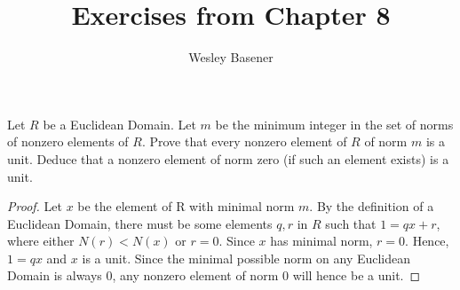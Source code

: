 \documentclass[10pt]{article}
\newenvironment{problem}[2][Problem]{\begin{trivlist}
		\item[\hskip \labelsep {\bfseries #1}\hskip \labelsep {\bfseries #2.}]}{\end{trivlist}}
\begin{document}
	
	\title{Exercises from Chapter 8}
	\author{Wesley Basener}
	\maketitle
	
	\begin{problem}{1.3}
		Let $R$ be a Euclidean Domain. Let $\mathit{m}$ be the minimum integer in the set of norms of nonzero elements of $R$. Prove that every nonzero element of $R$ of norm $\mathit{m}$ is a unit. Deduce that a nonzero element of norm zero (if such an element exists) is a unit.
		\begin{proof}
			Let $x$ be the element of R with minimal norm $\mathit{m}$. By the definition of a Euclidean Domain, there must be some elements $q, r$ in $R$ such that $1 = qx + r$, where either $N(r)<N(x)$ or $r=0$. Since $x$ has minimal norm, $r=0$. Hence, $1=qx$ and $x$ is a unit. Since the minimal possible norm on any Euclidean Domain is always $0$, any nonzero element of norm $0$ will hence be a unit.
			\end{proof}
	\end{problem}
	
\end{document}
